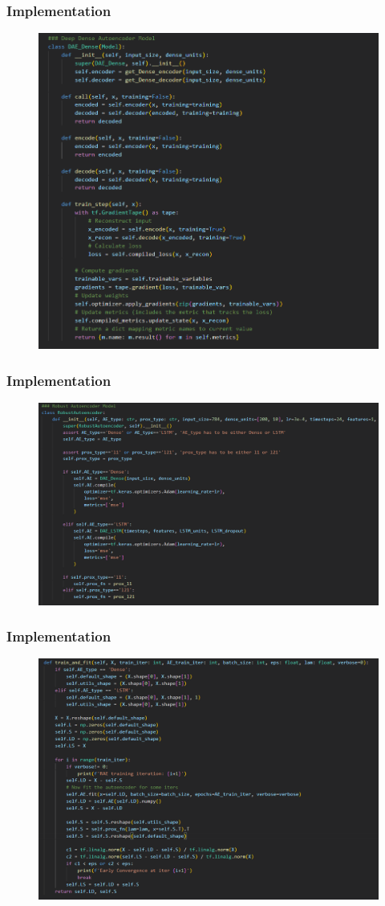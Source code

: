 \documentclass{beamer}
\theoremstyle{plain}
\theoremstyle{definition}
\theoremstyle{remark}
\begin{document}
\begin{frame}
    \frametitle{Implementation}
    \begin{figure}
		\centering
		\includegraphics[width=0.6\linewidth]{Images/code_ae.png}
	\end{figure}
\end{frame}

\begin{frame}
    \frametitle{Implementation}
    \begin{figure}
		\centering
		\includegraphics[width=0.8\linewidth]{Images/code_rdae_1.png}
	\end{figure}
\end{frame}

\begin{frame}
    \frametitle{Implementation}
    \begin{figure}
		\centering
		\includegraphics[width=0.8\linewidth]{Images/code_rdae_2.png}
	\end{figure}
\end{frame}
\end{document}
